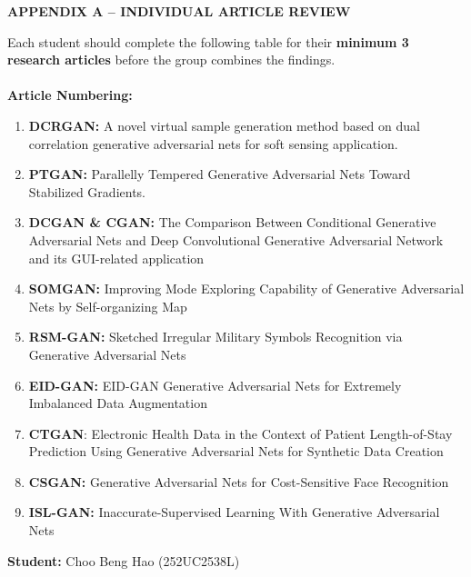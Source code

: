 \documentclass[12pt,a4paper]{article}
\begin{document}
\printbibliography[
    title={References}
]






\newpage

{}

\begin{flushleft}
    {\fontsize{14pt}{17pt}\selectfont
    \textbf{APPENDIX A -- INDIVIDUAL ARTICLE REVIEW}}
\end{flushleft}

\vspace{0.5cm}

\noindent Each student should complete the following table for their
\textbf{minimum 3 research articles} before the group combines the findings. \\ 
\\ \textbf{Article Numbering:}
\begin{enumerate}
    \item \textbf{DCRGAN:} A novel virtual sample generation method based on dual correlation generative adversarial nets for soft sensing application.
    \item \textbf{PTGAN:} Parallelly Tempered Generative Adversarial Nets Toward Stabilized Gradients.
    \item \textbf{DCGAN \& CGAN:} The Comparison Between Conditional Generative Adversarial Nets and Deep Convolutional Generative Adversarial Network and its GUI-related application
    \item \textbf{SOMGAN:} Improving Mode Exploring Capability of Generative Adversarial Nets by Self-organizing Map
    \item \textbf{RSM-GAN:} Sketched Irregular Military Symbols Recognition via Generative Adversarial Nets
    \item \textbf{EID-GAN:} EID-GAN Generative Adversarial Nets for Extremely Imbalanced Data Augmentation
    \item \textbf{CTGAN}: Electronic Health Data in the Context of Patient Length-of-Stay Prediction Using Generative Adversarial Nets for Synthetic Data Creation
    \item \textbf{CSGAN:} Generative Adversarial Nets for Cost-Sensitive Face Recognition
    \item \textbf{ISL-GAN:} Inaccurate-Supervised Learning With Generative Adversarial Nets
\end{enumerate}
\newpage
\noindent \textbf{Student:} Choo Beng Hao (252UC2538L)
\end{document}
